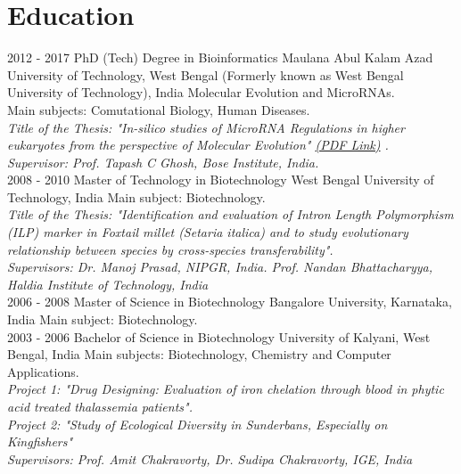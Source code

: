 \documentclass[]{friggeri-cv}
\begin{document}
\section{Education}
\begin{entrylist}
  \entry
    {2012 - 2017}
    {PhD (Tech) Degree in Bioinformatics}
    {Maulana Abul Kalam Azad University of Technology, West Bengal (Formerly known as West Bengal University of Technology), India}
    {Molecular Evolution and MicroRNAs.\\
    Main subjects: Comutational Biology, Human Diseases.\\
    \emph{Title of the Thesis: "In-silico studies of MicroRNA Regulations in higher eukaryotes from the perspective of Molecular Evolution" \href{http://library.wbut.ac.in/cgi-bin/koha/opac-retrieve-file.pl?id=579ff58a1245f1e3890d618e10f5cbad}{(PDF Link)}   .}\\
    \emph{Supervisor: Prof. Tapash C Ghosh, Bose Institute, India.}\\}
  \entry
    {2008 - 2010}
    {Master of Technology in Biotechnology}
    {West Bengal University of Technology, India}
    {Main subject: Biotechnology.\\
    \emph{Title of the Thesis: "Identification and evaluation of Intron Length Polymorphism (ILP) marker in Foxtail millet (Setaria italica) and to study evolutionary relationship between species by cross-species transferability".}\\
    \emph{Supervisors: Dr. Manoj Prasad, NIPGR, India. Prof. Nandan Bhattacharyya, Haldia Institute of Technology, India}\\}
 \entry
	{2006 - 2008}
	{Master of Science in Biotechnology}
	{Bangalore University, Karnataka, India}
	{Main subject: Biotechnology.\\}
\entry
	{2003 - 2006}
	{Bachelor of Science in Biotechnology}
	{University of Kalyani, West Bengal, India}
	{Main subjects: Biotechnology, Chemistry and Computer Applications.\\
	\emph{Project 1: "Drug Designing: Evaluation of iron chelation through blood in phytic acid treated thalassemia patients".}\\
	\emph{Project 2: "Study of Ecological Diversity in Sunderbans, Especially on Kingfishers"}\\
	\emph{Supervisors: Prof. Amit Chakravorty, Dr. Sudipa Chakravorty, IGE, India}\\}
\end{entrylist}
\newpage
\end{document}
